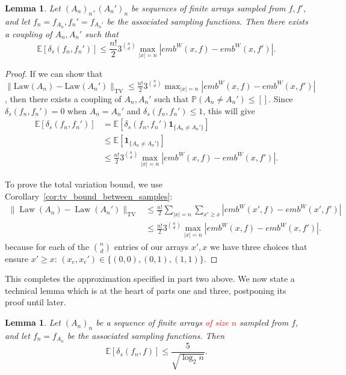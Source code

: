 \documentclass[11pt,oneside,reqno]{article}
\theoremstyle{plain}
\newtheorem{lemma}[theorem]{Lemma}
\theoremstyle{definition}
\numberwithin{equation}{section}
\renewcommand{\leq}{\leqslant}
\renewcommand{\geq}{\geqslant}
\newcommand{\red}{\textcolor{red}}
\begin{document}
\begin{lemma} \label{lem:coupling_of_samples}
    Let $(A_n)_n,(A_n')_n$ be sequences of finite arrays sampled from $f,f'$, and let $f_n = f_{A_n},f_n' = f_{A_n'}$ be the associated sampling functions. Then there exists a coupling of $A_n,A_n'$ such that
    $$\mathbb E[\delta_s(f_n,f_n')] \leq \frac{n!}{2} 3^{\binom{n}{d}} \max_{|x| = n} |emb^W(x,f) - emb^W(x,f')|.$$
\end{lemma}

\begin{proof}
    If we can show that $\| \text{Law}(A_n) - \text{Law}(A_n') \|_{\text{TV}} \leq \frac{n!}{2} 3^{\binom{n}{d}} \max_{|x| = n} |emb^W(x,f) - emb^W(x,f')|$, then there exists a coupling of $A_n,A_n'$ such that $\mathbb P(A_n \neq A_n') \leq []$. Since $\delta_s(f_n, f_n') = 0$ when $A_n = A_n'$ and $\delta_s(f_n, f_n') \leq 1$, this will give
    \begin{align*}
        \mathbb E[\delta_s(f_n,f_n')] &= \mathbb E[\delta_s(f_n,f_n') \mathbf 1_{\{A_n \neq A_n'\}}] \\
        &\leq \mathbb E[ \mathbf 1_{\{A_n \neq A_n'\}}] \\
        &\leq \frac{n!}{2} 3^{\binom{n}{d}} \max_{|x| = n} |emb^W(x,f) - emb^W(x,f')|.
    \end{align*}
    
    To prove the total variation bound, we use Corollary~\ref{cor:tv_bound_between_samples}:%
    \begin{align*}
        \| \operatorname{Law}(A_n) - \operatorname{Law}(A_n') \|_{\operatorname{TV}} &\leq \frac{n!}{2} \sum_{|x| = n} \sum_{x' \geq x} |emb^W(x',f) - emb^W(x',f')| \\
        &\leq \frac{n!}{2} 3^{\binom{n}{d}} \max_{|x| = n} |emb^W(x,f) - emb^W(x,f')|.
    \end{align*}
     because for each of the ${n \choose d}$ entries of our arrays $x', x$ we have three choices that ensure $x' \geq x$: $(x_e, x_e') \in \{(0,0), (0,1), (1,1)\}$. \qedhere
\end{proof}

This completes the approximation specified in part two above. We now state a technical lemma which is at the heart of parts one and three, postponing its proof until later.

\begin{lemma} \label{lem:finite_functions_converge_to_overall_sampling_functions}
    Let $(A_n)_n$ be a sequence of finite arrays \red{of size $n$} sampled from $f$, and let $f_n = f_{A_n}$ be the associated sampling functions. Then
    $$\mathbb E[\delta_s(f_n,f)] \leq \frac{5}{\sqrt{\log_2 n}}.$$
\end{lemma}
\end{document}
